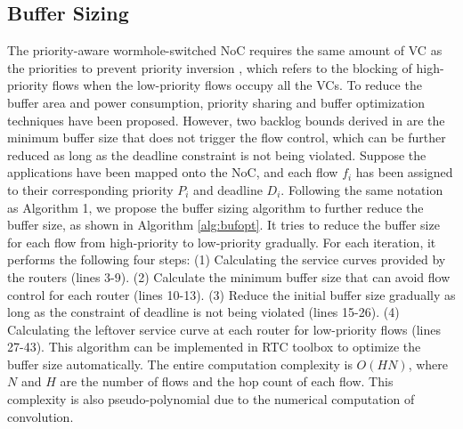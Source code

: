 \documentclass[10pt,journal]{IEEEtran}
\begin{document}
\subsection{Buffer Sizing}\label{bufferopt}
The priority-aware wormhole-switched NoC \cite{Shi:2008:RCA:1397757.1397996} requires the same amount of VC as the priorities to prevent priority inversion \cite{707545}, which refers to the blocking of high-priority flows when the low-priority flows occupy all the VCs. To reduce the buffer area and power consumption, priority sharing \cite{5161497} and buffer optimization \cite{189} techniques have been proposed. However, two backlog bounds derived in \cite{189} are the minimum buffer size that does not trigger the flow control, which can be further reduced as long as the deadline constraint is not being violated. Suppose the applications have been mapped onto the NoC, and each flow $f_i$ has been assigned to their corresponding priority $P_i$ and deadline $D_i$. Following the same notation as Algorithm 1, we propose the buffer sizing algorithm to further reduce the buffer size, as shown in Algorithm \ref{alg:bufopt}. It tries to reduce the buffer size for each flow from high-priority to low-priority gradually. For each iteration, it performs the following four steps: (1) Calculating the service curves provided by the routers (lines 3-9). (2) Calculate the minimum buffer size that can avoid flow control for each router (lines 10-13). (3) Reduce the initial buffer size gradually as long as the constraint of deadline is not being violated (lines 15-26). (4) Calculating the leftover service curve at each router for low-priority flows (lines 27-43). This algorithm can be implemented in RTC toolbox \cite{rtc} to optimize the buffer size automatically. The entire computation complexity is $O(HN)$, where $N$ and $H$ are the number of flows and the hop count of each flow. This complexity is also pseudo-polynomial due to the numerical computation of convolution.
\end{document}

